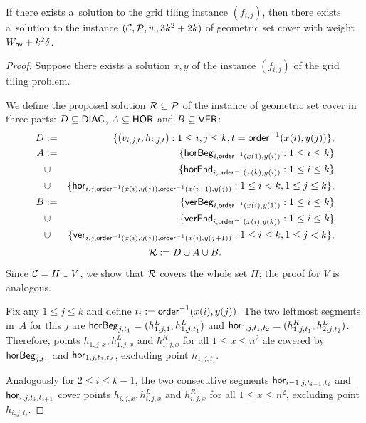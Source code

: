 \begin{lemma}
\label{set_cover_solution_exists}
	If there exists a~solution to the grid tiling instance $(f_{i,j})$,
	then there exists a~solution to the instance $(\mathcal{C}, \mathcal{P}, w, 3k^2+2k)$
	of geometric set cover with weight $W_{\mathsf{hv}}+k^2\delta$.
\end{lemma}

\begin{proof}
Suppose there exists a solution $x,y$ of the instance $(f_{i,j})$
of the grid tiling problem.
	
We define the proposed solution $\mathcal{R} \subseteq \mathcal{P}$ of the instance
of geometric set cover
in three parts: $D \subseteq \mathsf{DIAG}$, $A \subseteq \mathsf{HOR}$ and $B \subseteq \mathsf{VER}$:
\begin{eqnarray*}
	D & := & \{(v_{i, j, t}, h_{i, j, t}) : 1 \le i, j \le k, t = \mathsf{order}^{-1}(x(i), y(j))\}, \\
	A & := & \{\mathsf{horBeg}_{i,\mathsf{order}^{-1}(x(1), y(i))} : 1 \le i \le k\} \\
	& \cup & \{\mathsf{horEnd}_{i,\mathsf{order}^{-1}(x(k), y(i))} : 1 \le i \le k\} \\
	& \cup & \{\mathsf{hor}_{i,j,\mathsf{order}^{-1}(x(i), y(j)),\mathsf{order}^{-1}(x(i+1), y(j))} : 1 \le i < k, 1 \le j \le k\}, \\
	B & := & \{\mathsf{verBeg}_{i,\mathsf{order}^{-1}(x(i), y(1))} : 1 \le i \le k\} \\
	& \cup & \{\mathsf{verEnd}_{i,\mathsf{order}^{-1}(x(i), y(k))} : 1 \le i \le k\} \\
	& \cup & \{\mathsf{ver}_{i,j,\mathsf{order}^{-1}(x(i), y(j)),\mathsf{order}^{-1}(x(i), y(j+1))} : 1 \le i \le k, 1 \le j < k\},
\end{eqnarray*}
	$$\mathcal{R} := D \cup A \cup B.$$

Since $\mathcal{C} = H \cup V$, we show that $\mathcal{R}$ covers the whole set $H$;
the proof for $V$ is analogous.

Fix any $1 \le j \le k$ and define $t_{i} := \mathsf{order}^{-1}(x(i), y(j))$.
The two leftmost segments in~$A$ for this $j$ are
$\mathsf{horBeg}_{j,t_1} = (h_{1,j,1}^L, h_{1, j, t_1}^L)$ and
$\mathsf{hor}_{1,j,t_1,t_2} = (h_{1,j, t_1}^R, h_{2,j,t_2}^L)$.
Therefore, points $h_{1,j,x}, h_{1,j,x}^L$ and $h_{1,j,x}^R$
for all $1 \le x \le n^2$ ale covered by $\mathsf{horBeg}_{j,t_1}$ and $\mathsf{hor}_{1,j,t_1,t_2}$,
excluding point $h_{1,j,t_1}$.

Analogously for $2 \le i \le k-1$,
the two consecutive segments $\mathsf{hor}_{i-1,j,t_{i-1},t_i}$
and $\mathsf{hor}_{i,j,t_i,t_{i+1}}$ cover points $h_{i,j,x}, h_{i,j,x}^L$ and $h_{i,j,x}^R$
for all $1 \le x \le n^2$,
excluding point $h_{i,j,t_i}$.


\end{proof}
